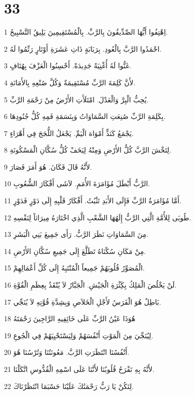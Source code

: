 \chapter{33}

\par 1 اِهْتِفُوا أَيُّهَا الصِّدِّيقُونَ بِالرَّبِّ. بِالْمُسْتَقِيمِينَ يَلِيقُ التَّسْبِيحُ.
\par 2 احْمَدُوا الرَّبَّ بِالْعُودِ. بِرَبَابَةٍ ذَاتِ عَشَرَةِ أَوْتَارٍ رَنِّمُوا لَهُ.
\par 3 غَنُّوا لَهُ أُغْنِيَةً جَدِيدَةً. أَحْسِنُوا الْعَزْفَ بِهُتَافٍ.
\par 4 لأَنَّ كَلِمَةَ الرَّبِّ مُسْتَقِيمَةٌ وَكُلَّ صُنْعِهِ بِالأَمَانَةِ.
\par 5 يُحِبُّ الْبِرَّ وَالْعَدْلَ. امْتَلَأَتِ الأَرْضُ مِنْ رَحْمَةِ الرَّبِّ.
\par 6 بِكَلِمَةِ الرَّبِّ صُنِعَتِ السَّمَاوَاتُ وَبِنَسَمَةِ فَمِهِ كُلُّ جُنُودِهَا.
\par 7 يَجْمَعُ كَنَدٍّ أَمْوَاهَ الْيَمِّ. يَجْعَلُ اللُّجَجَ فِي أَهْرَاءٍ.
\par 8 لِتَخْشَ الرَّبَّ كُلُّ الأَرْضِ وَمِنْهُ لِيَخَفْ كُلُّ سُكَّانِ الْمَسْكُونَةِ.
\par 9 لأَنَّهُ قَالَ فَكَانَ. هُوَ أَمَرَ فَصَارَ.
\par 10 الرَّبُّ أَبْطَلَ مُؤَامَرَةَ الأُمَمِ. لاَشَى أَفْكَارَ الشُّعُوبِ.
\par 11 أَمَّا مُؤَامَرَةُ الرَّبِّ فَإِلَى الأَبَدِ تَثْبُتُ. أَفْكَارُ قَلْبِهِ إِلَى دَوْرٍ فَدَوْرٍ.
\par 12 طُوبَى لِلأُمَّةِ الَّتِي الرَّبُّ إِلَهُهَا الشَّعْبِ الَّذِي اخْتَارَهُ مِيرَاثاً لِنَفْسِهِ.
\par 13 مِنَ السَّمَاوَاتِ نَظَرَ الرَّبُّ. رَأَى جَمِيعَ بَنِي الْبَشَرِ.
\par 14 مِنْ مَكَانِ سُكْنَاهُ تَطَلَّعَ إِلَى جَمِيعِ سُكَّانِ الأَرْضِ.
\par 15 الْمُصَوِّرُ قُلُوبَهُمْ جَمِيعاً الْمُنْتَبِهُ إِلَى كُلِّ أَعْمَالِهِمْ.
\par 16 لَنْ يَخْلُصَ الْمَلِكُ بِكَِثْرَةِ الْجَيْشِ. الْجَبَّارُ لاَ يُنْقَذُ بِعِظَمِ الْقُوَّةِ.
\par 17 بَاطِلٌ هُوَ الْفَرَسُ لأَجْلِ الْخَلاَصِ وَبِشِدَّةِ قُوَّتِهِ لاَ يُنَجِّي.
\par 18 هُوَذَا عَيْنُ الرَّبِّ عَلَى خَائِفِيهِ الرَّاجِينَ رَحْمَتَهُ
\par 19 لِيُنَجِّيَ مِنَ الْمَوْتِ أَنْفُسَهُمْ وَلِيَسْتَحْيِيَهُمْ فِي الْجُوعِ.
\par 20 أَنْفُسُنَا انْتَظَرَتِ الرَّبَّ. مَعُونَتُنَا وَتُرْسُنَا هُوَ.
\par 21 لأَنَّهُ بِهِ تَفْرَحُ قُلُوبُنَا لأَنَّنَا عَلَى اسْمِهِ الْقُدُّوسِ اتَّكَلْنَا.
\par 22 لِتَكُنْ يَا رَبُّ رَحْمَتُكَ عَلَيْنَا حَسْبَمَا انْتَظَرْنَاكَ.

